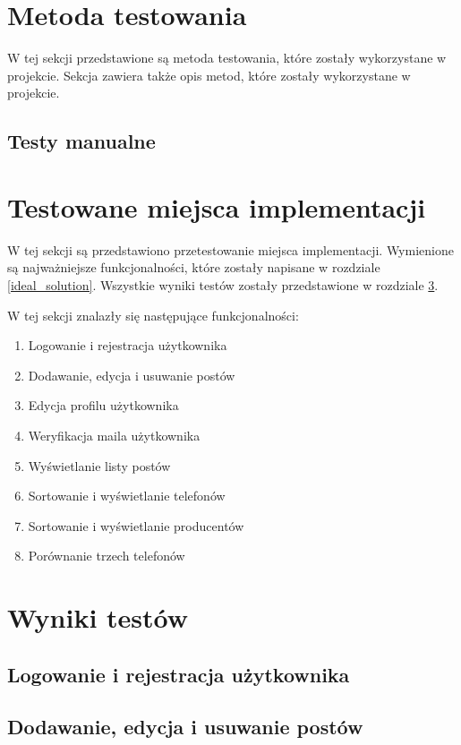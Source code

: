 \section{Metoda testowania}
W tej sekcji przedstawione są metoda testowania, które zostały wykorzystane w projekcie. Sekcja zawiera także opis metod, które zostały wykorzystane w projekcie. 

\subsection{Testy manualne}


\section{Testowane miejsca implementacji}
W tej sekcji są przedstawiono przetestowanie miejsca implementacji. Wymienione są najważniejsze funkcjonalności, które zostały napisane w rozdziale \ref{ideal_solution}. Wszystkie wyniki testów zostały przedstawione w rozdziale \ref{results}.

W tej sekcji znalazły się następujące funkcjonalności:
\begin{enumerate}
  \item Logowanie i rejestracja użytkownika
  \item Dodawanie, edycja i usuwanie postów
  \item Edycja profilu użytkownika
  \item Weryfikacja maila użytkownika
  \item Wyświetlanie listy postów
  \item Sortowanie i wyświetlanie telefonów
  \item Sortowanie i wyświetlanie producentów
  \item Porównanie trzech telefonów
\end{enumerate}

\section{Wyniki testów}\label{results}
\subsection{Logowanie i rejestracja użytkownika}

\subsection{Dodawanie, edycja i usuwanie postów}

